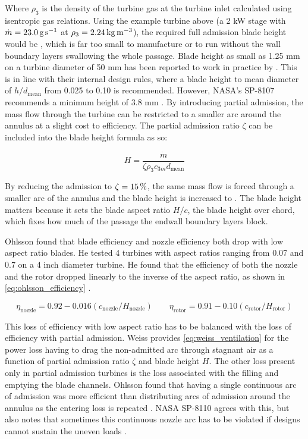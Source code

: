 Where $\rho_3$ is the density of the turbine gas at the turbine inlet calculated using isentropic gas relations. Using the example turbine above (a 2 kW stage with $\dot{m}=\qty{23.0}{\gram\per\second}$ at $\rho_3=\qty{2.24}{\kilo\gram\per\cubic\metre}$), the required full admission blade height would be \valTurbexHeightFull, which is far too small to manufacture or to run without the wall boundary layers swallowing the whole passage. Blade height as small as 1.25 mm on a turbine diameter of 50 mm has been reported to work in practice by \cite{weissCustomizedORCMicro2020}. This is in line with their internal design rules, where a blade height to mean diameter of $h/d_{\textrm{mean}}$ from 0.025 to 0.10 is recommended. However, NASA's SP-8107 recommends a minimum height of 3.8 mm \cite{TurbopumpSystemsLiquid1974}.  By introducing partial admission, the mass flow through the turbine can be restricted to a smaller arc around the annulus at a slight cost to efficiency. The partial admission ratio $\zeta$ can be included into the blade height formula as so:

\begin{equation}
    H = \frac{\dot{m}}{\zeta \rho_3 c_{3m} d_{\textrm{mean}}}
    \label{eq:turbine_blade_height}
\end{equation}

By reducing the admission to $\zeta=\qty{15}{\percent}$, the same mass flow is forced through a smaller arc of the annulus and the blade height is increased to \valTurbexHeightPartial. The blade height matters because it sets the blade aspect ratio $H/c$, the blade height over chord, which fixes how much of the passage the endwall boundary layers block. 

Ohlsson found that blade efficiency and nozzle efficiency both drop with low aspect ratio blades. He tested 4 turbines with aspect ratios ranging from 0.07 and 0.7 on a 4 inch diameter turbine. He found that the efficiency of both the nozzle and the rotor dropped linearly to the inverse of the aspect ratio, as shown in \cref{eq:ohlsson_efficiency} \cite{ohlssonLowAspectRatio1964}.

\begin{equation}
\eta_{\textrm{nozzle}} = 0.92 - 0.016(c_{\textrm{nozzle}}/H_{\textrm{nozzle}}) \qquad \eta_{\textrm{rotor}} = 0.91 - 0.10(c_{\textrm{rotor}}/H_{\textrm{rotor}})
\label{eq:ohlsson_efficiency}
\end{equation}

This loss of efficiency with low aspect ratio has to be balanced with the loss of efficiency with partial admission. Weiss provides \cref{eq:weiss_ventilation} for the power loss having to drag the non-admitted arc through stagnant air as a function of partial admission ratio $\zeta$ and blade height $H$. The other loss present only in partial admission turbines is the loss associated with the filling and emptying the blade channels. Ohlsson found that having a single continuous arc of admission was more efficient than distributing arcs of admission around the annulus as the entering loss is repeated \cite{ohlssonPartialAdmissionTurbines1962}. NASA SP-8110 agrees with this, but also notes that sometimes this continuous nozzle arc has to be violated if designs cannot sustain the uneven loads \cite{LiquidRocketEngine1974}.

